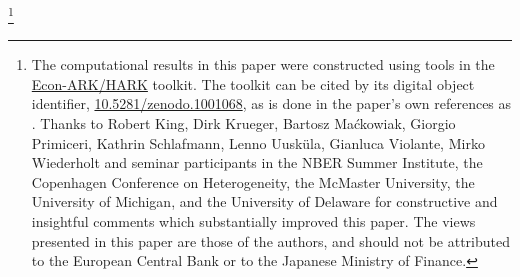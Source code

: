 \documentclass[titlepage]{./econtex}
\begin{document}
\begin{adjustwidth}{-1em}{-1em}
\begin{authorsinfo}
\end{authorsinfo}
\thanks{The computational results in this paper were constructed using tools in the \href{http://github.com/Econ-ARK/HARK}{Econ-ARK/HARK} toolkit.  The toolkit can be cited by its digital object identifier, \href{https://doi.org/10.5281/zenodo.1001068}{10.5281/zenodo.1001068}, as is done in the paper's own references as \cite{matthew_n_white_2017_1001068}.  Thanks to Robert King, Dirk Krueger, Bartosz Ma\'ckowiak, Giorgio Primiceri, Kathrin Schlafmann, Lenno Uusk\"ula, Gianluca Violante, Mirko Wiederholt and seminar participants in the NBER Summer Institute, the Copenhagen Conference on Heterogeneity, the McMaster University, the University of Michigan, and the University of Delaware for constructive and insightful comments which substantially improved this paper. The views presented in this paper are those of the authors, and should not be attributed to the European Central Bank or to the Japanese Ministry of Finance.}

\titlepagefinish
\setcounter{page}{1}
\end{adjustwidth}
\pagebreak
\end{document}
